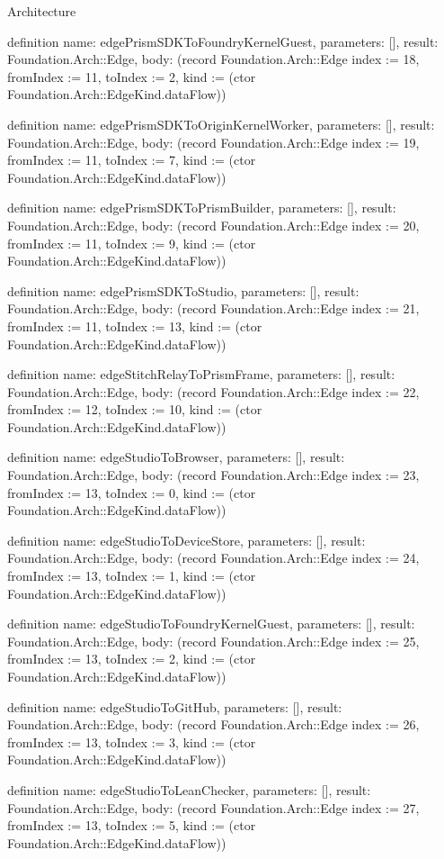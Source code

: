 \begin{lexlean}{Architecture}
\begin{semanticmodule}
definition{
  name: edgePrismSDKToFoundryKernelGuest,
  parameters: [],
  result: Foundation.Arch::Edge,
  body: (record Foundation.Arch::Edge {index := 18, fromIndex := 11, toIndex := 2, kind := (ctor Foundation.Arch::EdgeKind.dataFlow)})
}

definition{
  name: edgePrismSDKToOriginKernelWorker,
  parameters: [],
  result: Foundation.Arch::Edge,
  body: (record Foundation.Arch::Edge {index := 19, fromIndex := 11, toIndex := 7, kind := (ctor Foundation.Arch::EdgeKind.dataFlow)})
}

definition{
  name: edgePrismSDKToPrismBuilder,
  parameters: [],
  result: Foundation.Arch::Edge,
  body: (record Foundation.Arch::Edge {index := 20, fromIndex := 11, toIndex := 9, kind := (ctor Foundation.Arch::EdgeKind.dataFlow)})
}

definition{
  name: edgePrismSDKToStudio,
  parameters: [],
  result: Foundation.Arch::Edge,
  body: (record Foundation.Arch::Edge {index := 21, fromIndex := 11, toIndex := 13, kind := (ctor Foundation.Arch::EdgeKind.dataFlow)})
}

definition{
  name: edgeStitchRelayToPrismFrame,
  parameters: [],
  result: Foundation.Arch::Edge,
  body: (record Foundation.Arch::Edge {index := 22, fromIndex := 12, toIndex := 10, kind := (ctor Foundation.Arch::EdgeKind.dataFlow)})
}

definition{
  name: edgeStudioToBrowser,
  parameters: [],
  result: Foundation.Arch::Edge,
  body: (record Foundation.Arch::Edge {index := 23, fromIndex := 13, toIndex := 0, kind := (ctor Foundation.Arch::EdgeKind.dataFlow)})
}

definition{
  name: edgeStudioToDeviceStore,
  parameters: [],
  result: Foundation.Arch::Edge,
  body: (record Foundation.Arch::Edge {index := 24, fromIndex := 13, toIndex := 1, kind := (ctor Foundation.Arch::EdgeKind.dataFlow)})
}

definition{
  name: edgeStudioToFoundryKernelGuest,
  parameters: [],
  result: Foundation.Arch::Edge,
  body: (record Foundation.Arch::Edge {index := 25, fromIndex := 13, toIndex := 2, kind := (ctor Foundation.Arch::EdgeKind.dataFlow)})
}

definition{
  name: edgeStudioToGitHub,
  parameters: [],
  result: Foundation.Arch::Edge,
  body: (record Foundation.Arch::Edge {index := 26, fromIndex := 13, toIndex := 3, kind := (ctor Foundation.Arch::EdgeKind.dataFlow)})
}

definition{
  name: edgeStudioToLeanChecker,
  parameters: [],
  result: Foundation.Arch::Edge,
  body: (record Foundation.Arch::Edge {index := 27, fromIndex := 13, toIndex := 5, kind := (ctor Foundation.Arch::EdgeKind.dataFlow)})
}


\end{semanticmodule}
\end{lexlean}

